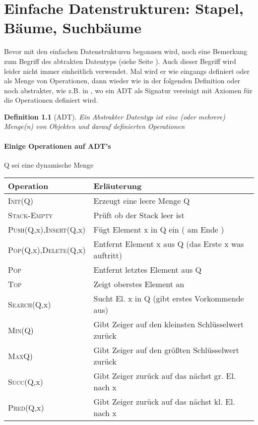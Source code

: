 \documentclass[ngerman,draft,parskip=half*,twoside]{scrreprt}
\theoremstyle{break}
\newtheorem{definition}{Definition}
\begin{document}
  \chapter{Einfache Datenstrukturen: Stapel, Bäume, Suchbäume}
  Bevor mit den einfachen Datenstrukturen begonnen wird,
  noch eine Bemerkung zum Begriff des abtrakten Datentyps (siehe Seite \pageref{ADT}).
  Auch dieser Begriff wird leider nicht immer einheitlich verwendet. Mal wird er wie eingangs definiert oder als Menge von Operationen,
  dann wieder wie in der
  folgenden Definition oder noch abstrakter, wie z.B. in \cite{guting}, wo ein ADT als Signatur vereinigt mit Axiomen für die
  Operationen definiert wird.

  \begin{definition}[ADT]
    Ein Abstrakter Datentyp ist eine (oder mehrere) Menge(n) von Objekten und
    darauf definierten Operationen
  \end{definition}

  \subsubsection{Einige Operationen auf ADT's}
  \begin{description}
  \item Q sei eine dynamische Menge
   
   \begin{tabular}[t]{@{}ll@{}} %
      Operation & Erläuterung \\
      \hline
      \textsc{Init}(Q) & Erzeugt eine leere Menge Q \\
      \textsc{Stack-Empty} & Prüft ob der Stack leer ist \\
      \textsc{Push}(Q,x),\textsc{Insert}(Q,x) & Fügt Element x in Q ein ( am Ende ) \\
      \textsc{Pop}(Q,x),\textsc{Delete}(Q,x) & Entfernt Element x aus Q (das Erste x was auftritt)\\
      \textsc{Pop} & Entfernt letztes Element aus Q\\
      \textsc{Top} & Zeigt oberstes Element an \\
      \textsc{Search}(Q,x) & Sucht El. x in Q (gibt erstes Vorkommende aus)\\
      \textsc{Min}(Q) & Gibt Zeiger auf den kleinsten Schlüsselwert zurück \\
      \textsc{Max}Q) & Gibt Zeiger auf den größten Schlüsselwert zurück \\
      \textsc{Succ}(Q,x) & Gibt Zeiger zurück auf das nächst gr. El. nach x\\
      \textsc{Pred}(Q,x) & Gibt Zeiger zurück auf das nächst kl. El. nach x 
   \end{tabular}
    
  \end{description}
\end{document}
